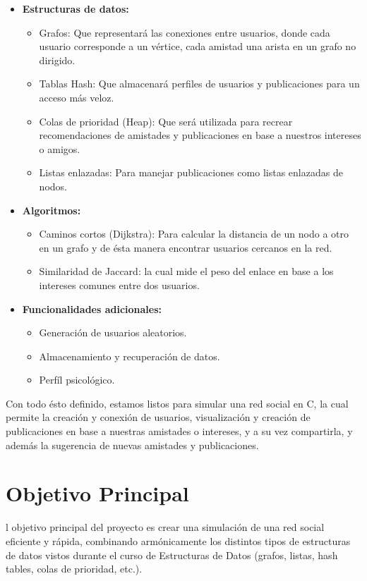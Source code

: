 \documentclass[9pt,letterpaper,onecolumn]{rho-class/rho}
\begin{document}
\begin{itemize}

\item \textbf{Estructuras de datos:}
\begin{itemize}
\item Grafos: Que representará las conexiones entre usuarios, donde cada usuario corresponde a un vértice, cada amistad una arista en un grafo no dirigido.
\item Tablas Hash: Que almacenará perfiles de usuarios y publicaciones para un acceso más veloz.
\item Colas de prioridad (Heap): Que será utilizada para recrear recomendaciones de amistades y publicaciones en base a nuestros intereses o amigos.
\item Listas enlazadas: Para manejar publicaciones como listas enlazadas de nodos.
\end{itemize}
\item \textbf{Algoritmos:}
\begin{itemize}
\item Caminos cortos (Dijkstra): Para calcular la distancia de un nodo a otro en un grafo y de ésta manera encontrar usuarios cercanos en la red.
\item Similaridad de Jaccard: la cual mide el peso del enlace en base a los intereses comunes entre dos usuarios.
\end{itemize}
\item \textbf{Funcionalidades adicionales:}
\begin{itemize}
\item Generación de usuarios aleatorios.
\item Almacenamiento y recuperación de datos.
\item Perfíl psicológico.
\end{itemize}
\end{itemize}

Con todo ésto definido, estamos listos para simular una red social en C, la cual permite la creación y conexión de usuarios, visualización y creación de publicaciones en base a nuestras amistades o intereses, y a su vez compartirla, y además la sugerencia de nuevas amistades y publicaciones.

\newpage
\section{Objetivo Principal}

    l objetivo principal del proyecto es crear una simulación de una red social eficiente y rápida, combinando armónicamente los distintos tipos de estructuras de datos vistos durante el curso de Estructuras de Datos (grafos, listas, hash tables, colas de prioridad, etc.).
\end{document}
